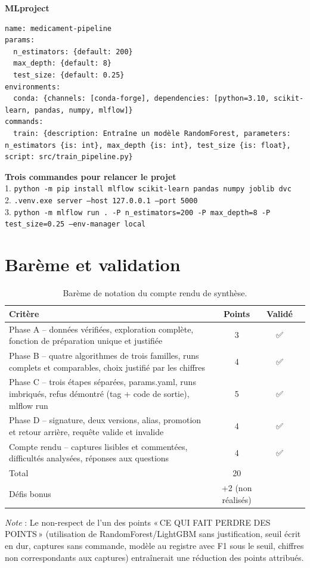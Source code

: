 \documentclass[12pt,a4paper]{report}
\begin{document}
\textbf{MLproject}
\begin{verbatim}
name: medicament-pipeline
params:
  n_estimators: {default: 200}
  max_depth: {default: 8}
  test_size: {default: 0.25}
environments:
  conda: {channels: [conda-forge], dependencies: [python=3.10, scikit-learn, pandas, numpy, mlflow]}
commands:
  train: {description: Entraîne un modèle RandomForest, parameters: n_estimators {is: int}, max_depth {is: int}, test_size {is: float}, script: src/train_pipeline.py}
\end{verbatim}

\textbf{Trois commandes pour relancer le projet} \\
1. \texttt{python -m pip install mlflow scikit-learn pandas numpy joblib dvc} \\
2. \texttt{.venv\Scripts\mlflow.exe server --host 127.0.0.1 --port 5000} \\
3. \texttt{python -m mlflow run . -P n_estimators=200 -P max_depth=8 -P test_size=0.25 --env-manager local}

\chapter*{Barème et validation}
\begin{table}[h!]
    \centering
    \begin{tabular}{lccc}
        \toprule
        Critère & Points & Validé \\
        \midrule
        Phase A – données vérifiées, exploration complète, fonction de préparation unique et justifiée & 3 & ✅ \\
        Phase B – quatre algorithmes de trois familles, runs complets et comparables, choix justifié par les chiffres & 4 & ✅ \\
        Phase C – trois étapes séparées, params.yaml, runs imbriqués, refus démontré (tag + code de sortie), mlflow run & 5 & ✅ \\
        Phase D – signature, deux versions, alias, promotion et retour arrière, requête valide et invalide & 4 & ✅ \\
        Compte rendu – captures lisibles et commentées, difficultés analysées, réponses aux questions & 4 & ✅ \\
        Total & 20 & \\
        Défis bonus & +2 (non réalisés) & \\
        \bottomrule
    \end{tabular}
\caption{Barème de notation du compte rendu de synthèse.}
\end{table}

\textit{Note} : Le non-respect de l'un des points « CE QUI FAIT PERDRE DES POINTS » (utilisation de RandomForest/LightGBM sans justification, seuil écrit en dur, captures sans commande, modèle au registre avec F1 sous le seuil, chiffres non correspondants aux captures) entraînerait une réduction des points attribués.
\end{document}
